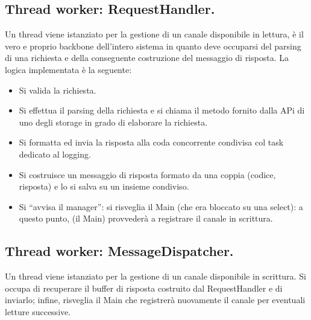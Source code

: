 \documentclass[11pt, italian, openany]{book}
\begin{document}
\begin{sloppypar}
\subsection*{Thread worker: RequestHandler.}
Un thread  viene istanziato per la gestione di un canale disponibile in lettura,
\`e il vero e proprio backbone dell'intero sistema in quanto deve occuparsi del parsing di una richiesta e della conseguente costruzione
del messaggio di risposta. La logica implementata \`e la seguente:
\begin{itemize}[itemsep=0pt, parsep=0pt, topsep=0pt]
	\item Si valida la richiesta.
	\item Si effettua il parsing della richiesta e si chiama il metodo fornito dalla APi di uno degli storage in grado di elaborare la
	richiesta.
	\item Si formatta ed invia la risposta alla coda concorrente condivisa col task dedicato al logging.
	\item Si costruisce un messaggio di risposta formato da una coppia (codice, risposta) e lo si salva su un insieme condiviso.
	\item Si ``avvisa il manager'': si risveglia il Main (che era bloccato su una select): a questo punto, (il Main) provveder\`a a
	registrare il canale in scrittura.
\end{itemize}

\subsection*{Thread worker: MessageDispatcher.}
Un thread  viene istanziato per la gestione di un canale disponibile in
scrittura. Si occupa di recuperare il buffer di risposta costruito dal RequestHandler e di inviarlo; infine, risveglia il Main che
registrer\`a nuovamente il canale per eventuali letture successive.


\end{sloppypar}
\end{document}

